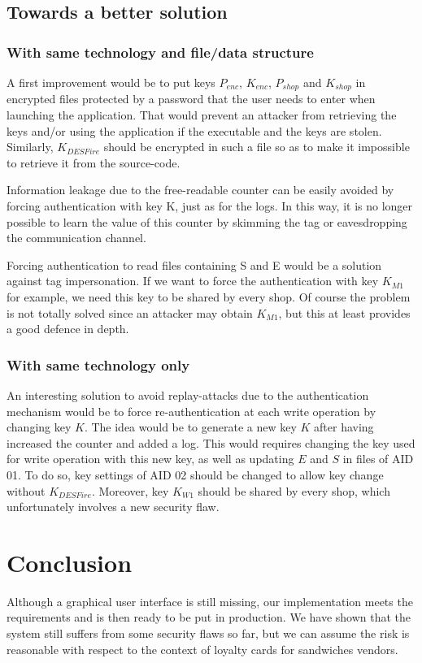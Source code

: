 \documentclass[a4paper,11pt,oneside]{article}
\begin{document}
\newpage
\subsection{Towards a better solution}

\subsubsection{With same technology and file/data structure}

A first improvement would be to put keys $P_{enc}$, $K_{enc}$, $P_{shop}$ and
$K_{shop}$ in encrypted files protected by a password that the user needs to
enter when launching the application. That would prevent an attacker from
retrieving the keys and/or using the application if the executable and the keys
are stolen. Similarly, $K_{DESFire}$ should be encrypted in such a file so as to
make it impossible to retrieve it from the source-code. 

Information leakage due to the free-readable counter can be easily avoided by
forcing authentication with key K, just as for the logs. In this way, it is no
longer possible to learn the value of this counter by skimming the tag or
eavesdropping the communication channel. 

Forcing authentication to read files containing S and E would be a solution
against tag impersonation. If we want to force the authentication with key
$K_{M1}$ for example, we need this key to be shared by every shop. Of course the
problem is not totally solved since an attacker may obtain $K_{M1}$, but this at
least provides a good defence in depth. 


\subsubsection{With same technology only}

An interesting solution to avoid replay-attacks due to the authentication
mechanism would be to force re-authentication at each write operation by
changing key $K$. The idea would be to generate a new key $K$ after having increased
the counter and added a log. This would requires changing the key used for write
operation with this new key, as well as updating $E$ and $S$ in files of AID 01. To
do so, key settings of AID 02 should be changed to allow key change without
$K_{DESFire}$. Moreover, key $K_{W1}$ should be shared by every shop, which
unfortunately involves a new security flaw. 

\section{Conclusion}

Although a graphical user interface is still missing, our implementation meets
the requirements and is then ready to be put in production. We have shown that
the system  still suffers from some security flaws so far, but we can assume the
risk is reasonable with respect to the context of loyalty cards for sandwiches
vendors. 
\end{document}
